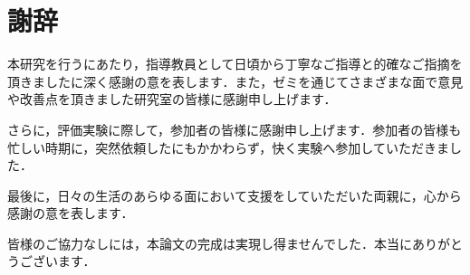 \documentclass[main]{subfiles}
\begin{document}
\chapter{謝辞}
本研究を行うにあたり，指導教員として日頃から丁寧なご指導と的確なご指摘を頂きました\teacherName に深く感謝の意を表します．また，ゼミを通じてさまざまな面で意見や改善点を頂きました研究室の皆様に感謝申し上げます．

さらに，評価実験に際して，参加者の皆様に感謝申し上げます．参加者の皆様も忙しい時期に，突然依頼したにもかかわらず，快く実験へ参加していただきました．

最後に，日々の生活のあらゆる面において支援をしていただいた両親に，心から感謝の意を表します．

皆様のご協力なしには，本論文の完成は実現し得ませんでした．本当にありがとうございます．
\end{document}

